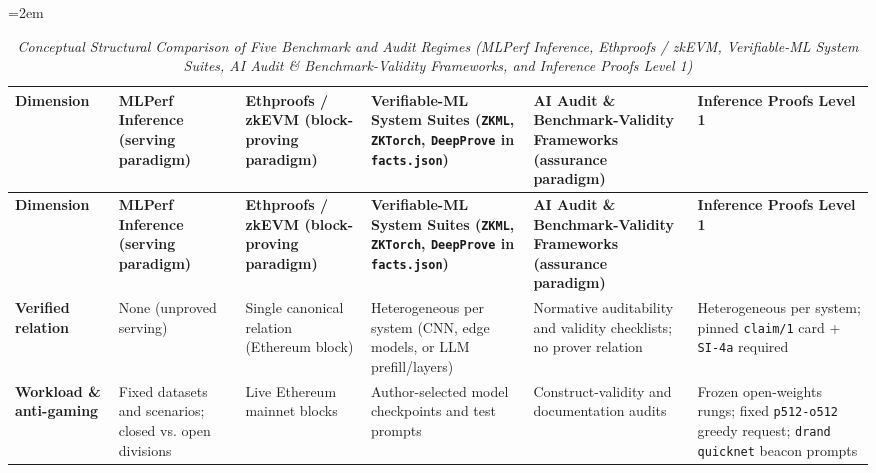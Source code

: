 \documentclass[11pt,letterpaper]{article}
\begin{document}
{\scriptsize\setlength{\tabcolsep}{3.5pt}\emergencystretch=2em
\begin{longtable}{@{}>{\raggedright\arraybackslash}p{} >{\raggedright\arraybackslash}p{} >{\raggedright\arraybackslash}p{} >{\raggedright\arraybackslash}p{} >{\raggedright\arraybackslash}p{} >{\raggedright\arraybackslash}p{}@{}}
\caption{\textit{Conceptual Structural Comparison of Five Benchmark and Audit Regimes (MLPerf Inference, Ethproofs / zkEVM, Verifiable-ML System Suites, AI Audit \& Benchmark-Validity Frameworks, and Inference Proofs Level 1)} \cite{iproofs2026}} \\
\toprule
\textbf{Dimension} & \textbf{MLPerf Inference (serving paradigm)} & \textbf{Ethproofs / zkEVM (block-proving paradigm)} & \textbf{Verifiable-ML System Suites (\texttt{ZKML}, \texttt{ZKTorch}, \texttt{DeepProve} in \texttt{facts.\allowbreak{}json})} & \textbf{AI Audit \& Benchmark-Validity Frameworks (assurance paradigm)} & \textbf{Inference Proofs Level 1 \cite{iproofs2026}} \\
\midrule
\endfirsthead
\toprule
\textbf{Dimension} & \textbf{MLPerf Inference (serving paradigm)} & \textbf{Ethproofs / zkEVM (block-proving paradigm)} & \textbf{Verifiable-ML System Suites (\texttt{ZKML}, \texttt{ZKTorch}, \texttt{DeepProve} in \texttt{facts.\allowbreak{}json})} & \textbf{AI Audit \& Benchmark-Validity Frameworks (assurance paradigm)} & \textbf{Inference Proofs Level 1 \cite{iproofs2026}} \\
\midrule
\endhead
\bottomrule
\endfoot
\textbf{Verified relation} & None (unproved serving) & Single canonical relation (Ethereum block) & Heterogeneous per system (CNN, edge models, or LLM prefill/layers) & Normative auditability and validity checklists; no prover relation & Heterogeneous per system; pinned \texttt{claim/\allowbreak{}1} card + \texttt{SI-4a} required \\
\textbf{Workload \& anti-gaming} & Fixed datasets and scenarios; closed vs. open divisions & Live Ethereum mainnet blocks & Author-selected model checkpoints and test prompts & Construct-validity and documentation audits & Frozen open-weights rungs; fixed \texttt{p512-\allowbreak{}o512} greedy request; \texttt{drand quicknet} beacon prompts \\

\end{longtable}}
\end{document}
